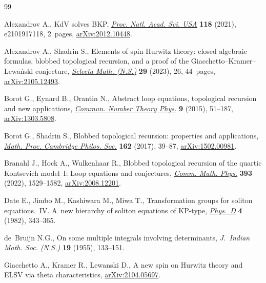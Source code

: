 \documentclass[10pt,a4paper]{amsart}
\numberwithin{equation}{section}
\begin{document}
\begin{thebibliography}{99}
\footnotesize\itemsep=0pt

Alexandrov A., Kd{V} solves {BKP}, \href{https://doi.org/10.1073/pnas.2101917118}{\textit{Proc. Natl. Acad. Sci. USA}}
 \textbf{118} (2021), e2101917118, 2~pages, \href{https://arxiv.org/abs/2012.10448}{arXiv:2012.10448}.

Alexandrov A., Shadrin S., Elements of spin {H}urwitz theory: closed algebraic
 formulas, blobbed topological recursion, and a proof of the
 {G}iacchetto--{K}ramer--{L}ewa\'nski conjecture, \href{https://doi.org/10.1007/s00029-023-00834-1}{\textit{Selecta Math.
 (N.S.)}} \textbf{29} (2023), 26, 44~pages, \href{https://arxiv.org/abs/2105.12493}{arXiv:2105.12493}.

Borot G., Eynard B., Orantin N., Abstract loop equations, topological recursion
 and new applications, \href{https://doi.org/10.4310/CNTP.2015.v9.n1.a2}{\textit{Commun. Number Theory Phys.}} \textbf{9} (2015),
 51--187, \href{https://arxiv.org/abs/1303.5808}{arXiv:1303.5808}.

Borot G., Shadrin S., Blobbed topological recursion: properties and
 applications, \href{https://doi.org/10.1017/S0305004116000323}{\textit{Math. Proc. Cambridge Philos. Soc.}} \textbf{162}
 (2017), 39--87, \href{https://arxiv.org/abs/1502.00981}{arXiv:1502.00981}.

Branahl J., Hock A., Wulkenhaar R., Blobbed topological recursion of the
 quartic {K}ontsevich model~{I}: {L}oop equations and conjectures,
 \href{https://doi.org/10.1007/s00220-022-04392-z}{\textit{Comm. Math. Phys.}} \textbf{393} (2022), 1529--1582,
 \href{https://arxiv.org/abs/2008.12201}{arXiv:2008.12201}.

Date E., Jimbo M., Kashiwara M., Miwa T., Transformation groups for soliton
 equations.~{IV}. {A}~new hierarchy of soliton equations of {KP}-type,
 \href{https://doi.org/10.1016/0167-2789(82)90041-0}{\textit{Phys.~D}} \textbf{4} (1982), 343--365.

de~Bruijn N.G., On some multiple integrals involving determinants,
 \textit{J.~Indian Math. Soc. (N.S.)} \textbf{19} (1955), 133--151.

Giacchetto A., Kramer R., Lewanski D., A new spin on {H}urwitz theory and
 {ELSV} via theta characteristics, \href{https://arxiv.org/abs/2104.05697}{arXiv:2104.05697}.


\end{thebibliography}
\end{document}

